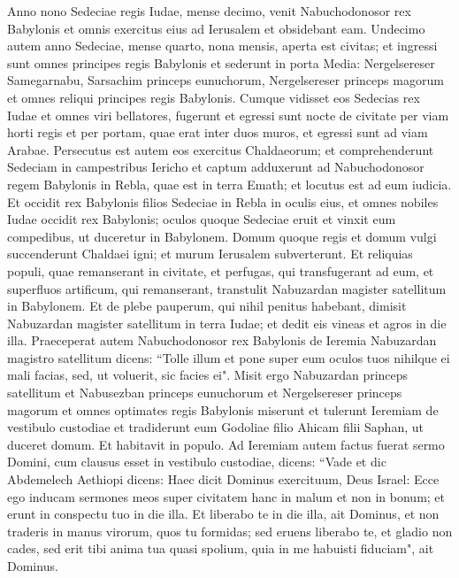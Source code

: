 \begin{biblechapter}  
\verse Anno nono Sedeciae regis Iudae, mense decimo, venit Nabuchodonosor rex Babylonis et omnis exercitus eius ad Ierusalem et obsidebant eam. 
\verse Undecimo autem anno Sedeciae, mense quarto, nona mensis, aperta est civitas; 
\verse et ingressi sunt omnes principes regis Babylonis et sederunt in porta Media: Nergelsereser Samegarnabu, Sarsachim princeps eunuchorum, Nergelsereser princeps magorum et omnes reliqui principes regis Babylonis. 
\verse Cumque vidisset eos Sedecias rex Iudae et omnes viri bellatores, fugerunt et egressi sunt nocte de civitate per viam horti regis et per portam, quae erat inter duos muros, et egressi sunt ad viam Arabae. 
\verse Persecutus est autem eos exercitus Chaldaeorum; et comprehenderunt Sedeciam in campestribus Iericho et captum adduxerunt ad Nabuchodonosor regem Babylonis in Rebla, quae est in terra Emath; et locutus est ad eum iudicia. 
\verse Et occidit rex Babylonis filios Sedeciae in Rebla in oculis eius, et omnes nobiles Iudae occidit rex Babylonis; 
\verse oculos quoque Sedeciae eruit et vinxit eum compedibus, ut duceretur in Babylonem. 
\verse Domum quoque regis et domum vulgi succenderunt Chaldaei igni; et murum Ierusalem subverterunt. 
\verse Et reliquias populi, quae remanserant in civitate, et perfugas, qui transfugerant ad eum, et superfluos artificum, qui remanserant, transtulit Nabuzardan magister satellitum in Babylonem. 
\verse Et de plebe pauperum, qui nihil penitus habebant, dimisit Nabuzardan magister satellitum in terra Iudae; et dedit eis vineas et agros in die illa. 
\verse Praeceperat autem Nabuchodonosor rex Babylonis de Ieremia Nabuzardan magistro satellitum dicens: 
\verse “Tolle illum et pone super eum oculos tuos nihilque ei mali facias, sed, ut voluerit, sic facies ei". 
\verse Misit ergo Nabuzardan princeps satellitum et Nabusezban princeps eunuchorum et Nergelsereser princeps magorum et omnes optimates regis Babylonis 
\verse miserunt et tulerunt Ieremiam de vestibulo custodiae et tradiderunt eum Godoliae filio Ahicam filii Saphan, ut duceret domum. Et habitavit in populo. 
\verse Ad Ieremiam autem factus fuerat sermo Domini, cum clausus esset in vestibulo custodiae, dicens: 
\verse “Vade et dic Abdemelech Aethiopi dicens: Haec dicit Dominus exercituum, Deus Israel: Ecce ego inducam sermones meos super civitatem hanc in malum et non in bonum; et erunt in conspectu tuo in die illa. 
\verse Et liberabo te in die illa, ait Dominus, et non traderis in manus virorum, quos tu formidas; 
\verse sed eruens liberabo te, et gladio non cades, sed erit tibi anima tua quasi spolium, quia in me habuisti fiduciam", ait Dominus. 
\end{biblechapter}

